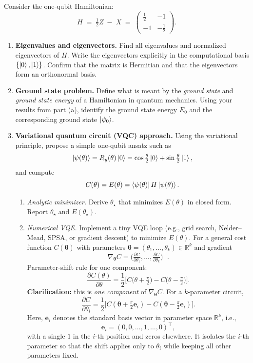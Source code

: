 \documentclass[11pt]{article}
\begin{document}
Consider the one-qubit Hamiltonian:
\[
H \;=\; \tfrac{1}{2}Z \; - \; X
\;=\;
\begin{pmatrix}
\tfrac{1}{2} & -1\\[4pt]
-1 & -\tfrac{1}{2}
\end{pmatrix}.
\]

\begin{enumerate}[label=(\alph*)]
  \item \textbf{Eigenvalues and eigenvectors.}  
  Find all eigenvalues and normalized eigenvectors of $H$. Write the eigenvectors explicitly in the computational basis $\{\ket{0},\ket{1}\}$. Confirm that the matrix is Hermitian and that the eigenvectors form an orthonormal basis.

  \item \textbf{Ground state problem.}  
  Define what is meant by the \emph{ground state} and \emph{ground state energy} of a Hamiltonian in quantum mechanics. Using your results from part (a), identify the ground state energy $E_0$ and the corresponding ground state $\ket{\psi_0}$.

  \item \textbf{Variational quantum circuit (VQC) approach.}  
Using the variational principle, propose a simple one-qubit ansatz such as
\[
\ket{\psi(\theta)} = R_y(\theta)\ket{0} = \cos\tfrac{\theta}{2}\ket{0} + \sin\tfrac{\theta}{2}\ket{1},
\]
and compute
\[
C(\theta) = E(\theta)  =  \bra{\psi(\theta)}H\ket{\psi(\theta)}.
\]
\begin{enumerate}[label=(\roman*)]
  \item \emph{Analytic minimizer.} Derive \(\theta_\star\) that minimizes \({E(\theta)}\) in closed form. Report \({\theta_\star}\) and \({E(\theta_\star)}\).
  \item \emph{Numerical VQE.} Implement a tiny VQE loop (e.g., grid search, Nelder–Mead, SPSA, or gradient descent) to minimize \({E(\theta)}\). For a general cost function $C(\boldsymbol{\theta})$
with parameters $\boldsymbol{\theta}=(\theta_1,\ldots,\theta_k)\in\mathbb{R}^k$ and gradient
\[
\nabla_{\boldsymbol{\theta}} C
=\Big(\tfrac{\partial C}{\partial\theta_1},\ldots,\tfrac{\partial C}{\partial\theta_k}\Big)^{\!\top}.
\]
Parameter-shift rule for one component:
\[
\frac{\partial C(\theta)}{\partial\theta}
=\frac{1}{2}\Big[C\!\big(\theta+\tfrac{\pi}{2}\big)-C\!\big(\theta-\tfrac{\pi}{2}\big)\Big].
\]
\textbf{Clarification:} this is \emph{one component} of $\nabla_{\boldsymbol{\theta}} C$.
For a $k$-parameter circuit,
\[
\frac{\partial C}{\partial\theta_i}
=\frac{1}{2}\Big[C(\boldsymbol{\theta}+\tfrac{\pi}{2}\mathbf{e}_i)-C(\boldsymbol{\theta}-\tfrac{\pi}{2}\mathbf{e}_i)\Big].
\]
Here, \(\mathbf{e}_i\) denotes the standard basis vector in parameter space \(\mathbb{R}^k\), i.e.,
\[
\mathbf{e}_i = (0,0,\ldots,1,\ldots,0)^{\top},
\]
with a single \(1\) in the \(i\)-th position and zeros elsewhere. It isolates the \(i\)-th parameter so that the shift applies only to \(\theta_i\) while keeping all other parameters fixed.


\end{enumerate}
\end{enumerate}
\end{document}
